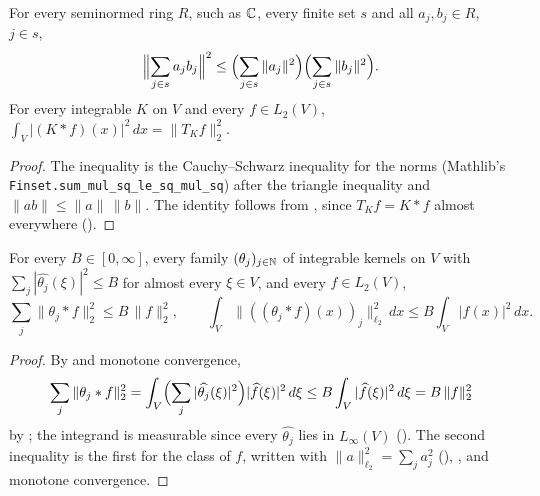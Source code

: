 \begin{lemma}
\label{lem:l2-squares}
\leanok
{}
For every seminormed ring $R$, such as $\mathbb{C}$, every finite set $s$ and all $a_j, b_j \in R$,
$j \in s$,
\[
  \Bigl\|\sum_{j \in s} a_j b_j\Bigr\|^2 \leq \Bigl(\sum_{j \in s} \|a_j\|^2\Bigr)
  \Bigl(\sum_{j \in s} \|b_j\|^2\Bigr).
\]
For every integrable $K$ on $V$ and every $f \in L_2(V)$,
$\int_V |(K * f)(x)|^2 \, dx = \|T_K f\|_2^2$.
\end{lemma}

\begin{proof}
\leanok
The inequality is the Cauchy--Schwarz inequality for the norms (Mathlib's
\texttt{Finset.\allowbreak sum\_mul\_sq\_le\_sq\_mul\_sq}) after the triangle inequality and
$\|a b\| \leq \|a\| \, \|b\|$. The identity follows from , since
$T_K f = K * f$ almost everywhere ().
\end{proof}

\begin{theorem}
\label{thm:l2-analysis-bound}
\leanok
{}
For every $B \in [0, \infty]$, every family $(\theta_j)_{j \in \mathbb{N}}$ of integrable kernels on $V$
with $\sum_j |\widehat{\theta_j}(\xi)|^2 \leq B$ for almost every $\xi \in V$, and every
$f \in L_2(V)$,
\[
  \sum_j \|\theta_j * f\|_2^2 \leq B \, \|f\|_2^2 , \qquad
  \int_V \|((\theta_j * f)(x))_j\|_{\ell_2}^2 \, dx \leq B \int_V |f(x)|^2 \, dx .
\]
\end{theorem}

\begin{proof}
\leanok
By  and monotone convergence,
\[
  \sum_j \|\theta_j * f\|_2^2
  = \int_V \Bigl(\sum_j |\widehat{\theta_j}(\xi)|^2\Bigr) |\widehat f(\xi)|^2 \, d\xi
  \leq B \int_V |\widehat f(\xi)|^2 \, d\xi = B \, \|f\|_2^2
\]
by ; the integrand is measurable since every $\widehat{\theta_j}$ lies
in $L_\infty(V)$ (). The second inequality is the first for the
class of $f$, written with $\|a\|_{\ell_2}^2 = \sum_j a_j^2$ (),
,  and monotone convergence.
\end{proof}

